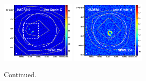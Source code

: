 \documentclass[iop]{emulateapj}
\begin{document}
\begin{figure}[!tbp]
\begin{centering}
\includegraphics[width=0.331\textwidth]{HADFS10_870_250.pdf}
\includegraphics[width=0.331\textwidth]{HADFS01_870_250.pdf}
\end{centering}

\caption{ Continued.}
\addtocounter{figure}{-1}

\end{figure}
\end{document}
